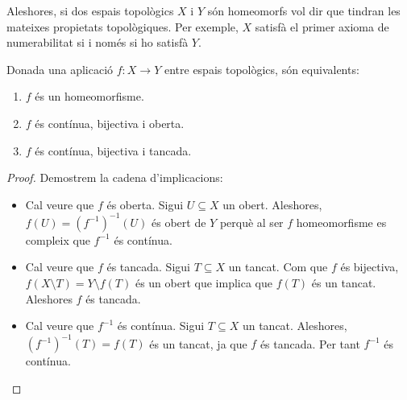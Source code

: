 \documentclass[../main.tex]{subfiles}
\begin{document}
Aleshores, si dos espais topològics $X$ i $Y$ són homeomorfs vol dir que tindran les mateixes propietats topològiques. Per exemple, $X$ satisfà el primer axioma de numerabilitat si i només si ho satisfà $Y$.

\begin{prop}
\label{prop:propietathomeomorfismes}
Donada una aplicació $f:X\rightarrow Y$ entre espais topològics, són equivalents:
\begin{enumerate}[(1)]
    \item $f$ és un homeomorfisme.
    \item $f$ és contínua, bijectiva i oberta.
    \item $f$ és contínua, bijectiva i tancada.
\end{enumerate}
\end{prop}
\begin{proof}
Demostrem la cadena d'implicacions:
\begin{itemize}
    \item {} Cal veure que $f$ és oberta. Sigui $U\subseteq X$ un obert. Aleshores, $f(U) = (f^{-1})^{-1}(U)$ és obert de $Y$ perquè al ser $f$ homeomorfisme es compleix que $f^{-1}$ és contínua.
    \item {} Cal veure que $f$ és tancada. Sigui $T\subseteq X$ un tancat. Com que $f$ és bijectiva, $f(X\setminus T) = Y\setminus f(T)$ és un obert que implica que $f(T)$ és un tancat. Aleshores $f$ és tancada.
    \item {} Cal veure que $f^{-1}$ és contínua. Sigui $T\subseteq X$ un tancat. Aleshores, $(f^{-1})^{-1}(T) = f(T)$ és un tancat, ja que $f$ és tancada. Per tant $f^{-1}$ és contínua.
\end{itemize}
\end{proof}
\end{document}
